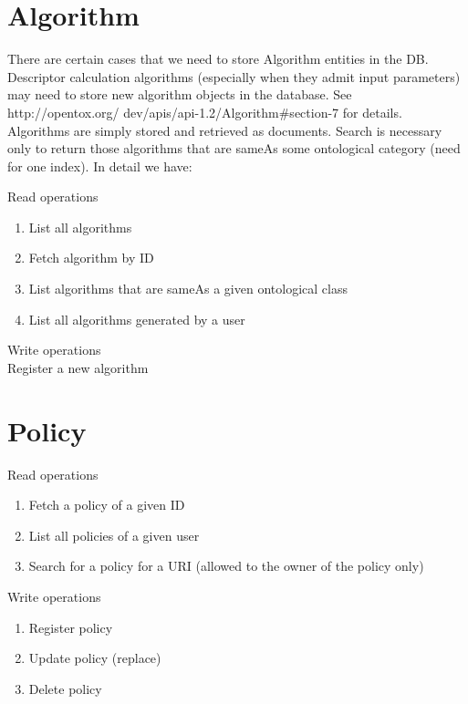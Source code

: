 \section{Algorithm}

There are certain cases that we need to store Algorithm entities
in the DB. Descriptor calculation algorithms (especially when they 
admit input parameters) may need to store new algorithm objects in the database. 
See http://opentox.org/
dev/apis/api-1.2/Algorithm\#section-7 for details. 
Algorithms are simply stored and retrieved as documents. Search is necessary only 
to return those algorithms that are sameAs some ontological category (need for one index). 
In detail we have:

\noindent Read operations
\begin{enumerate}
 \item List all algorithms
\item  Fetch algorithm by ID
\item  List algorithms that are sameAs a given ontological class
\item  List all algorithms generated by a user
\end{enumerate}

\noindent Write operations\\
Register a new algorithm

\section{Policy}

\noindent Read operations
\begin{enumerate}
 \item Fetch a policy of a given ID
\item  List all policies of a given user
\item  Search for a policy for a URI (allowed to the owner of the policy only)
\end{enumerate}


\noindent Write operations
\begin{enumerate}
\item  Register policy
\item  Update policy (replace)
\item  Delete policy
\end{enumerate}